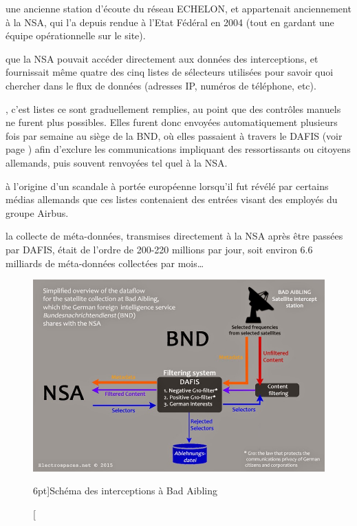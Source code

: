  une ancienne station d'écoute du réseau ECHELON,
et appartenait anciennement à la NSA, qui l'a depuis rendue à l'Etat Fédéral en
2004 (tout en gardant une équipe opérationnelle sur le site).\autocite{spiegel}

 que la NSA pouvait accéder directement aux données
des interceptions, et fournissait même quatre des cinq listes de sélecteurs
utilisées pour savoir quoi chercher dans le flux de données (adresses IP,
numéros de téléphone, etc). 

, c'est listes ce sont graduellement
remplies, au point que des contrôles manuels ne furent plus possibles. Elles
furent donc envoyées automatiquement plusieurs fois par semaine au siège de la
BND, où elles passaient à travers le DAFIS (voir page \pageref{dafis}) afin
d'exclure les communications impliquant des ressortissants ou citoyens
allemands, puis souvent renvoyées tel quel à la NSA.

 à l'origine d'un scandale à portée européenne
lorsqu'il fut révélé par certains médias allemands que ces listes contenaient
des entrées visant des employés du groupe Airbus\autocite{airbus}.

 la collecte de méta-données, transmises directement à la
NSA après être passées par DAFIS, était de l'ordre de 200-220 millions par jour,
soit environ 6.6 milliards de méta-données collectées par mois\ldots\autocite{meta}


\begin{figure}
\includegraphics{ba2.jpg}
\caption[Schéma des interceptions à Bad Aibling][6pt]{Schéma des interceptions à Bad Aibling}
\label{fig:ba2}
\end{figure}


